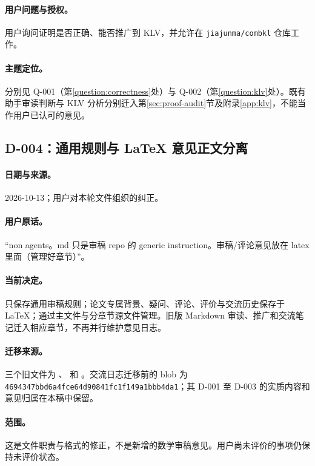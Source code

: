 \paragraph{用户问题与授权。}用户询问证明是否正确、能否推广到 KLV，并允许在 \texttt{jiajunma/combkl} 仓库工作。
\paragraph{主题定位。}分别见 Q-001（第\ref{question:correctness}处）与 Q-002（第\ref{question:klv}处）。既有助手审读判断与 KLV 分析分别迁入第\ref{sec:proof-audit}节及附录\ref{app:klv}，不能当作用户已认可的意见。

\subsection{D-004：通用规则与 LaTeX 意见正文分离}\label{dialogue:D004}
\paragraph{日期与来源。}2026-10-13；用户对本轮文件组织的纠正。
\paragraph{用户原话。}“non agents。md 只是审稿 repo 的 generic instruction。审稿/评论意见放在 latex 里面（管理好章节）”。
\paragraph{当前决定。} 只保存通用审稿规则；论文专属背景、疑问、评论、评价与交流历史保存于 LaTeX；通过主文件与分章节源文件管理。旧版 Markdown 审读、推广和交流笔记迁入相应章节，不再并行维护意见日志。
\paragraph{迁移来源。}三个旧文件为 、 和 。交流日志迁移前的 blob 为 \nolinkurl{4694347bbd6a4fce64d90841fc1f149a1bbb4da1}；其 D-001 至 D-003 的实质内容和意见归属在本稿中保留。
\paragraph{范围。}这是文件职责与格式的修正，不是新增的数学审稿意见。用户尚未评价的事项仍保持未评价状态。
